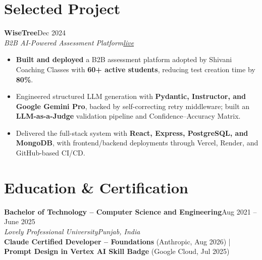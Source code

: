 \documentclass[10pt,a4paper]{article}
\newcommand{\resumeentry}[4]{%
  \noindent\textbf{#1}\hfill #2\\[-1pt]
  \noindent\textit{#3}\hfill\textit{#4}\\[-1pt]
}
\begin{document}
\section*{Selected Project}
\resumeentry{WiseTree}{Dec 2024}{B2B AI-Powered Assessment Platform}{\href{https://wisetree-exam-main.vercel.app/login}{live}}
\begin{itemize}\small
\item \textbf{Built and deployed} a B2B assessment platform adopted by Shivani Coaching Classes with \textbf{60+ active students}, reducing test creation time by \textbf{80\%}.
\item Engineered structured LLM generation with \textbf{Pydantic, Instructor, and Google Gemini Pro}, backed by self-correcting retry middleware; built an \textbf{LLM-as-a-Judge} validation pipeline and Confidence--Accuracy Matrix.
\item Delivered the full-stack system with \textbf{React, Express, PostgreSQL, and MongoDB}, with frontend/backend deployments through Vercel, Render, and GitHub-based CI/CD.
\end{itemize}
\section*{Education \& Certification}
\resumeentry{Bachelor of Technology -- Computer Science and Engineering}{Aug 2021 -- June 2025}{Lovely Professional University}{Punjab, India}
\small\textbf{Claude Certified Developer -- Foundations} (Anthropic, Aug 2026) \;|\; \textbf{Prompt Design in Vertex AI Skill Badge} (Google Cloud, Jul 2025)
\end{document}
